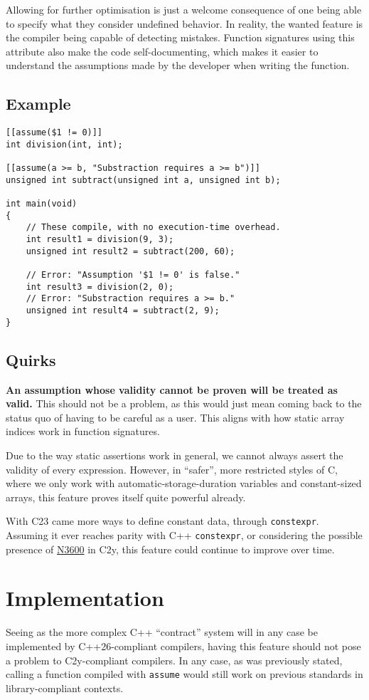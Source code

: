 \documentclass[a4paper, 12pt]{article}
\begin{document}
Allowing for further optimisation is just a welcome consequence of one being able
to specify what they consider undefined behavior.  In reality, the wanted feature is the compiler
being capable of detecting mistakes.  Function signatures using this attribute also
make the code self-documenting, which makes it easier to understand the assumptions made by the developer
when writing the function.
\subsection{Example}
\label{sec:org19c925f}
\begin{verbatim}
[[assume($1 != 0)]]
int division(int, int);

[[assume(a >= b, "Substraction requires a >= b")]]
unsigned int subtract(unsigned int a, unsigned int b);

int main(void)
{
    // These compile, with no execution-time overhead.
    int result1 = division(9, 3);
    unsigned int result2 = subtract(200, 60);

    // Error: "Assumption '$1 != 0' is false."
    int result3 = division(2, 0);
    // Error: "Substraction requires a >= b."
    unsigned int result4 = subtract(2, 9);
}
\end{verbatim}
\subsection{Quirks}
\label{sec:org3b2256e}
\textbf{An assumption whose validity cannot be proven will be treated as valid.}
This should not be a problem, as this would just mean coming back to the
status quo of having to be careful as a user.
This aligns with how static array indices work in function signatures.

Due to the way static assertions work in general, we cannot always assert
the validity of every expression.  However, in ``safer'', more restricted
styles of C, where we only work with automatic-storage-duration variables
and constant-sized arrays, this feature proves itself quite powerful already.

With C23 came more ways to define constant data, through \texttt{constexpr}.  Assuming
it ever reaches parity with C++ \texttt{constexpr}, or considering the possible
presence of \href{https://open-std.org/jtc1/sc22/wg14/www/docs/n3600.htm}{N3600} in C2y, this feature could continue to improve over time.
\section{Implementation}
\label{sec:org150f5e1}
Seeing as the more complex C++ ``contract'' system will in any case be implemented
by C++26-compliant compilers, having this feature should not pose a problem to
C2y-compliant compilers. In any case, as was previously stated, calling a function
compiled with \texttt{assume} would still work on previous standards in library-compliant
contexts.
\end{document}
